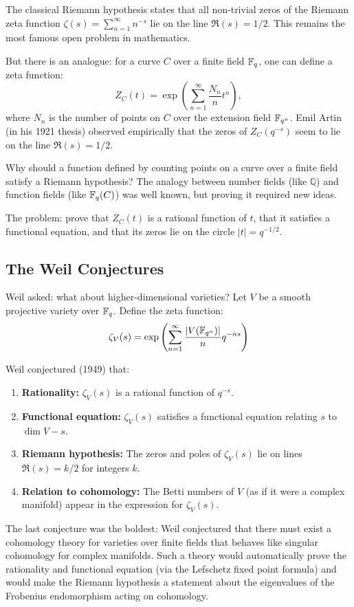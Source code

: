 The classical Riemann hypothesis states that all non-trivial zeros of the Riemann zeta function $\zeta(s) = \sum_{n=1}^\infty n^{-s}$ lie on the line $\Re(s) = 1/2$. This remains the most famous open problem in mathematics.

But there is an analogue: for a curve $C$ over a finite field $\mathbb{F}_q$, one can define a zeta function:
\[
Z_C(t) = \exp\left( \sum_{n=1}^\infty \frac{N_n}{n} t^n \right),
\]
where $N_n$ is the number of points on $C$ over the extension field $\mathbb{F}_{q^n}$. Emil Artin (in his 1921 thesis) observed empirically that the zeros of $Z_C(q^{-s})$ seem to lie on the line $\Re(s) = 1/2$.

Why should a function defined by counting points on a curve over a finite field satisfy a Riemann hypothesis? The analogy between number fields (like $\mathbb{Q}$) and function fields (like $\mathbb{F}_q(C)$) was well known, but proving it required new ideas.

The problem: prove that $Z_C(t)$ is a rational function of $t$, that it satisfies a functional equation, and that its zeros lie on the circle $|t| = q^{-1/2}$.

\subsection{The Weil Conjectures}

Weil asked: what about higher-dimensional varieties? Let $V$ be a smooth projective variety over $\mathbb{F}_q$. Define the zeta function:
\[
\zeta_V(s) = \exp\left( \sum_{n=1}^\infty \frac{|V(\mathbb{F}_{q^n})|}{n} q^{-ns} \right)
\]

Weil conjectured (1949) that:
\begin{enumerate}
    \item \textbf{Rationality:} $\zeta_V(s)$ is a rational function of $q^{-s}$.
    \item \textbf{Functional equation:} $\zeta_V(s)$ satisfies a functional equation relating $s$ to $\dim V - s$.
    \item \textbf{Riemann hypothesis:} The zeros and poles of $\zeta_V(s)$ lie on lines $\Re(s) = k/2$ for integers $k$.
    \item \textbf{Relation to cohomology:} The Betti numbers of $V$ (as if it were a complex manifold) appear in the expression for $\zeta_V(s)$.
\end{enumerate}

The last conjecture was the boldest: Weil conjectured that there must exist a cohomology theory for varieties over finite fields that behaves like singular cohomology for complex manifolds. Such a theory would automatically prove the rationality and functional equation (via the Lefschetz fixed point formula) and would make the Riemann hypothesis a statement about the eigenvalues of the Frobenius endomorphism acting on cohomology.

